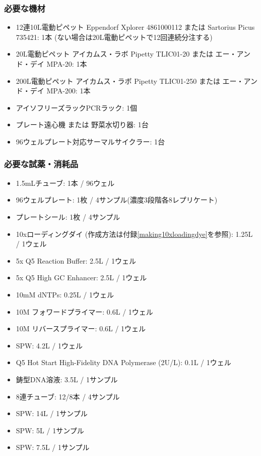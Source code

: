 \documentclass[titlepage,10pt,a4paper,uplatex]{jsbook}
\begin{document}
\subsubsection{必要な機材}
\begin{itemize}
\item 12連10{\textmu}L電動ピペット Eppendorf Xplorer 4861000112 または Sartorius Picus 735421: 1本 (ない場合は20{\textmu}L電動ピペットで12回連続分注する)
\item 20{\textmu}L電動ピペット アイカムス・ラボ Pipetty TLIC01-20 または エー・アンド・デイ MPA-20: 1本
\item 200{\textmu}L電動ピペット アイカムス・ラボ Pipetty TLIC01-250 または エー・アンド・デイ MPA-200: 1本
\item アイソフリーズラックPCRラック: 1個
\item プレート遠心機 または 野菜水切り器: 1台
\item 96ウェルプレート対応サーマルサイクラー: 1台
\end{itemize}

\subsubsection{必要な試薬・消耗品}
\begin{itemize}
\item 1.5mLチューブ: 1本 / 96ウェル
\item 96ウェルプレート: 1枚 / 4サンプル(濃度3段階各8レプリケート)
\item プレートシール: 1枚 / 4サンプル
\item 10xローディングダイ (作成方法は付録\ref{making10xloadingdye}を参照): 1.25{\textmu}L / 1ウェル
\item 5x Q5 Reaction Buffer: 2.5{\textmu}L / 1ウェル
\item 5x Q5 High GC Enhancer: 2.5{\textmu}L / 1ウェル
\item 10mM dNTPs: 0.25{\textmu}L / 1ウェル
\item 10{\textmu}M フォワードプライマー: 0.6{\textmu}L / 1ウェル
\item 10{\textmu}M リバースプライマー: 0.6{\textmu}L / 1ウェル
\item SPW: 4.2{\textmu}L / 1ウェル
\item Q5 Hot Start High-Fidelity DNA Polymerase (2U/{\textmu}L): 0.1{\textmu}L / 1ウェル
\item 鋳型DNA溶液: 3.5{\textmu}L / 1サンプル
\item 8連チューブ: 12/8本 / 4サンプル
\item SPW: 14{\textmu}L / 1サンプル
\item SPW: 5{\textmu}L / 1サンプル
\item SPW: 7.5{\textmu}L / 1サンプル
\end{itemize}
\end{document}
